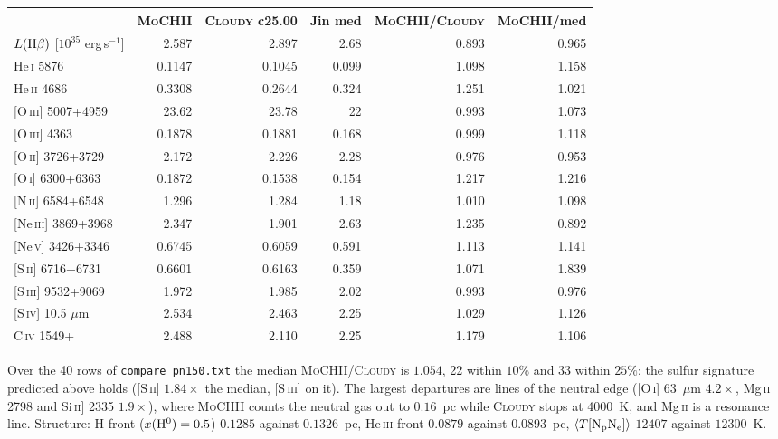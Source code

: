 \documentclass[english,a4paper]{my_memo}
\newcommand{\code}[1]{\texttt{#1}}
\newcommand{\MoCHII}{\textsc{MoCHII}}
\newcommand{\Cloudy}{\textsc{Cloudy}}
\begin{document}
\begingroup\small
\begin{center}
\begin{tabular}{lrrrrr}
\toprule
& \MoCHII{} & \Cloudy{} c25.00 & Jin med & \MoCHII{}/\Cloudy{} & \MoCHII{}/med \\
\midrule
$L({\rm H}\beta)$ [$10^{35}$ erg\,s$^{-1}$] & 2.587 & 2.897 & 2.68 & 0.893 & 0.965 \\
He\,\textsc{i} 5876              & 0.1147 & 0.1045 & 0.099 & 1.098 & 1.158 \\
He\,\textsc{ii} 4686             & 0.3308 & 0.2644 & 0.324 & 1.251 & 1.021 \\
{}[O\,\textsc{iii}] 5007+4959    & 23.62  & 23.78  & 22    & 0.993 & 1.073 \\
{}[O\,\textsc{iii}] 4363         & 0.1878 & 0.1881 & 0.168 & 0.999 & 1.118 \\
{}[O\,\textsc{ii}] 3726+3729     & 2.172  & 2.226  & 2.28  & 0.976 & 0.953 \\
{}[O\,\textsc{i}] 6300+6363      & 0.1872 & 0.1538 & 0.154 & 1.217 & 1.216 \\
{}[N\,\textsc{ii}] 6584+6548     & 1.296  & 1.284  & 1.18  & 1.010 & 1.098 \\
{}[Ne\,\textsc{iii}] 3869+3968   & 2.347  & 1.901  & 2.63  & 1.235 & 0.892 \\
{}[Ne\,\textsc{v}] 3426+3346     & 0.6745 & 0.6059 & 0.591 & 1.113 & 1.141 \\
{}[S\,\textsc{ii}] 6716+6731     & 0.6601 & 0.6163 & 0.359 & 1.071 & 1.839 \\
{}[S\,\textsc{iii}] 9532+9069    & 1.972  & 1.985  & 2.02  & 0.993 & 0.976 \\
{}[S\,\textsc{iv}] 10.5 $\mu$m   & 2.534  & 2.463  & 2.25  & 1.029 & 1.126 \\
C\,\textsc{iv} 1549+             & 2.488  & 2.110  & 2.25  & 1.179 & 1.106 \\
\bottomrule
\end{tabular}
\end{center}
\endgroup

\noindent
Over the 40 rows of \code{compare\_pn150.txt} the median
\MoCHII{}/\Cloudy{} is $1.054$, 22 within $10\%$ and 33 within $25\%$; the
sulfur signature predicted above holds ([S\,\textsc{ii}] $1.84\times$ the
median, [S\,\textsc{iii}] on it).  The largest departures are lines of the
neutral edge ([O\,\textsc{i}] 63~$\mu$m $4.2\times$, Mg\,\textsc{ii} 2798
and Si\,\textsc{ii}] 2335 $1.9\times$), where \MoCHII{} counts the neutral
gas out to $0.16$~pc while \Cloudy{} stops at 4000~K, and Mg\,\textsc{ii}
is a resonance line.  Structure: H front ($x({\rm H^0}) = 0.5$) $0.1285$
against $0.1326$~pc, He\,\textsc{iii} front $0.0879$ against $0.0893$~pc,
$\langle T[{\rm N_pN_e}]\rangle$ $12407$ against $12300$~K.
\end{document}
